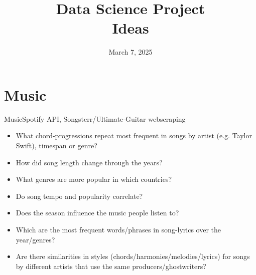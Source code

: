 

\title[Data Science Project: Ideas]{Data Science Project \\ \small Ideas}
\date{March 7, 2025}


    \maketitle

    \section{Music}
    \begin{frame}{Music}{Spotify API, Songsterr/Ultimate-Guitar webscraping}
        \begin{itemize}[<+->]
            \item What chord-progressions repeat most frequent in songs by artist (e.g. Taylor Swift), timespan or genre?
            \item How did song length change through the years?
            \item What genres are more popular in which countries?
            \item Do song tempo and popularity correlate?
            \item Does the season influence the music people listen to?
            \item Which are the most frequent words/phrases in song-lyrics over the year/genres?
            \item Are there similarities in styles (chords/harmonies/melodies/lyrics) for songs by different artists that use the same producers/ghostwriters?
        \end{itemize}
    \end{frame}

